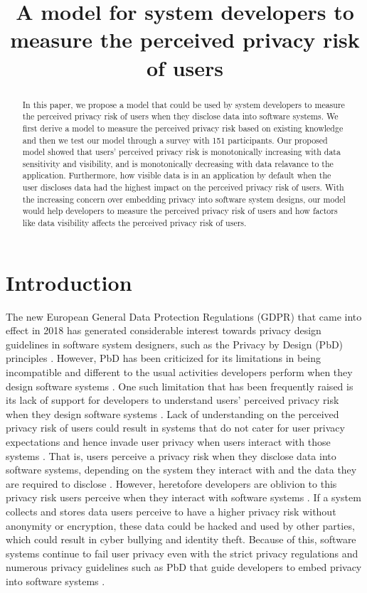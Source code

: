 \documentclass[10pt]{article}
\title{A model for system developers to measure the perceived privacy risk of users}
\date{}
\begin{document}
\maketitle
\begin{abstract}
In this paper, we propose a model that could be used by system developers to measure the perceived privacy risk of users when they disclose data into software systems. We first derive a model to measure the perceived privacy risk based on existing knowledge and then we test our model through a survey with 151 participants. Our proposed model showed that users' perceived privacy risk is monotonically increasing with data sensitivity and visibility, and is monotonically decreasing with data relavance to the application. Furthermore, how visible data is in an application by default when the user discloses data had the highest impact on the perceived privacy risk of users.  With the increasing concern over embedding privacy into software system designs, our model would help developers to measure the perceived privacy risk of users and how factors like data visibility affects the perceived privacy risk of users. 
\end{abstract}



\section{Introduction}
The new European General Data Protection Regulations (GDPR) that came into effect in 2018 has generated considerable interest towards privacy design guidelines in software system designers, such as the Privacy by Design (PbD) principles \cite {wagner2016national}. However, PbD has been criticized for its limitations in being incompatible and different to the usual activities developers perform when they design software systems \cite {senarath2017designing, ayalon2018crowdsourcing}. One such limitation that has been frequently raised is its lack of support for developers to understand users' perceived privacy risk when they design software systems \cite {ayalon2018crowdsourcing}. Lack of understanding on the perceived privacy risk of users could result in systems that do not cater for user privacy expectations and hence invade user privacy when users interact with those systems \cite {senarath2018why}. That is, users perceive a privacy risk when they disclose data into software systems, depending on the system they interact with and the data they are required to disclose \cite {malheiros2013fairly}. However, heretofore developers are oblivion to this privacy risk users perceive when they interact with software systems \cite {senarath2018under, oetzel2014systematic, senarath2018why}. If a system collects and stores data users perceive to have a higher privacy risk without anonymity or encryption, these data could be hacked and used by other parties, which could result in cyber bullying and identity theft. Because of this, software systems continue to fail user privacy even with the strict privacy regulations \cite {wagner2016national} and numerous privacy guidelines such as PbD that guide developers to embed privacy into software systems \cite {senarath2018why}.
\end{document}
